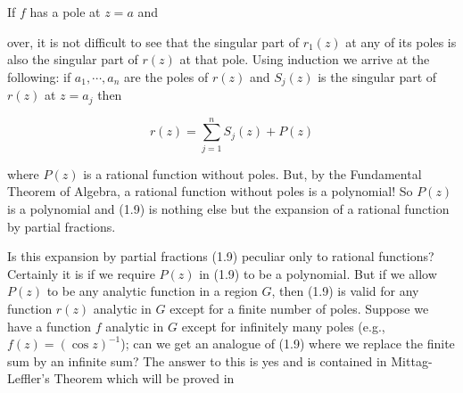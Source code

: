 If $f$ has a pole at $z = a$ and

over, it is not difficult to see that the singular part of $r_1(z)$ at any of its poles is also the singular part of $r(z)$ at that pole. Using induction we arrive at the following: if $a_1, \cdots, a_n$ are the poles of $r(z)$ and $S_j(z)$ is the singular part of $r(z)$ at $z = a_j$ then

$$r(z) = \sum_{j=1}^{n} S_j(z) + P(z)$$

where $P(z)$ is a rational function without poles. But, by the Fundamental Theorem of Algebra, a rational function without poles is a polynomial! So $P(z)$ is a polynomial and (1.9) is nothing else but the expansion of a rational function by partial fractions.

Is this expansion by partial fractions (1.9) peculiar only to rational functions? Certainly it is if we require $P(z)$ in (1.9) to be a polynomial. But if we allow $P(z)$ to be any analytic function in a region $G$, then (1.9) is valid for any function $r(z)$ analytic in $G$ except for a finite number of poles. Suppose we have a function $f$ analytic in $G$ except for infinitely many poles (e.g., $f(z) = (\cos z)^{-1}$); can we get an analogue of (1.9) where we replace the finite sum by an infinite sum? The answer to this is yes and is contained in Mittag-Leffler’s Theorem which will be proved in